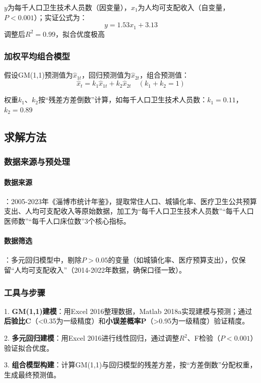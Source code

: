 \documentclass{MathNoteCN}
\begin{document}
$y$为每千人口卫生技术人员数（因变量），$x_1$为人均可支配收入（自变量，$P<0.001$）；实证公式为：
\[y=1.53x_1 + 3.13\]
调整后$R^2=0.99$，拟合优度极高\cite{wang2025}

\subsubsection{加权平均组合模型}
假设GM(1,1)预测值为$\hat{x}_{1t}$，回归预测值为$\hat{x}_{2t}$，组合预测值：  
\[\hat{x}_t = k_1 \hat{x}_{1t} + k_2 \hat{x}_{2t} \quad (k_1 + k_2 = 1)\]

权重$k_1、k_2$按“残差方差倒数”计算，如每千人口卫生技术人员数：$k_1=0.11$，$k_2=0.89$\cite{wang2025}


\subsection{求解方法}
\subsubsection{数据来源与预处理}
\paragraph{数据来源}：2005-2023年《淄博市统计年鉴》，提取常住人口、城镇化率、医疗卫生公共预算支出、人均可支配收入等原始数据，加工为“每千人口卫生技术人员数”“每千人口医师数”“每千人口床位数”3个核心指标\cite{wang2025}。
\paragraph{数据筛选}：多元回归模型中，剔除$P>0.05$的变量（如城镇化率、医疗预算支出），仅保留“人均可支配收入”（2014-2022年数据，确保口径一致）\cite{wang2025}。

\subsubsection{工具与步骤}

1. \textbf{GM(1,1)建模}：用Excel 2016整理数据，Matlab 2018a实现建模与预测；通过\textbf{后验比C}（<0.35为一级精度）和\textbf{小误差概率P}（>0.95为一级精度）验证精度\cite{wang2025}。

2. \textbf{多元回归建模}：用Excel 2016进行线性回归，通过调整$R^2$、F检验（$P<0.001$）验证拟合优度\cite{wang2025}。

3. \textbf{组合模型构建}：计算GM(1,1)与回归模型的残差方差，按“方差倒数”分配权重，生成最终预测值\cite{wang2025}。
\end{document}
